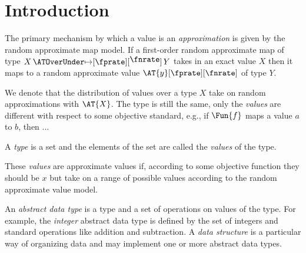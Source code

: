 \documentclass[ ../main.tex]{subfiles}
\begin{document}
\section{Introduction}


The primary mechanism by which a value is an \emph{approximation} is given by the random approximate map model.
If a first-order random approximate map of type $X \amapsto{\fprate}{\fnrate} Y$ takes in an exact value $X$ then it maps to a random approximate value $\AT{y}[\fprate][\fnrate]$ of type $Y$.

We denote that the distribution of values over a type $X$ take on random approximations with $\AT{X}$.
The type is still the same, only the \emph{values} are different with respect to some objective standard, e.g., if $\Fun{f}$ maps a value $a$ to $b$, then ...

A \emph{type} is a set and the elements of the set are called the \emph{values} of the type.

These \emph{values} are approximate values if, according to some objective function they should be $x$ but take on a range of possible values according to the random approximate value model.


An \emph{abstract data type} is a type and a set of operations on 
values of the type.
For example, the \emph{integer} abstract data type is defined by the set of integers and standard operations like addition and subtraction.
A \emph{data structure} is a particular way of organizing data and may implement one or more abstract data types.
\end{document}
